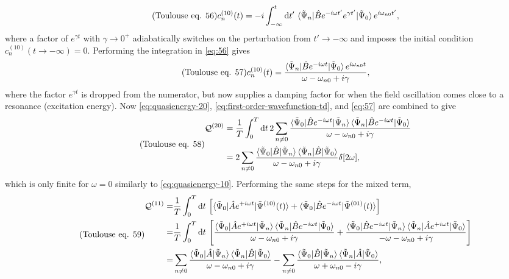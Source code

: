 \documentclass[%
class = book,%
crop = false,%
float = true,%
multi = true,%
preview = false,%
]{standalone}
\begin{document}
\begin{equation}
  \label{eq:56} \tag{Toulouse eq. 56}
  c_{n}^{(10)}(t) = -i \int_{-\infty}^{t} \mathrm{d}t' \, \braket{\tilde{\Psi}_{n}|\hat{B}e^{-i\omega t'}e^{\gamma t'}|\tilde{\Psi}_{0}}e^{i\omega_{n0}t'},
\end{equation}
where a factor of \(e^{\gamma t}\) with \(\gamma \rightarrow 0^{+}\) adiabatically switches on the perturbation from \(t' \rightarrow -\infty\) and imposes the initial condition \(c_{n}^{(10)}(t \rightarrow -\infty) = 0\). Performing the integration in \eqref{eq:56} gives
\begin{equation}
  \label{eq:57} \tag{Toulouse eq. 57}
  c_{n}^{(10)}(t) = \frac{\braket{\tilde{\Psi}_{n}|\hat{B}e^{-i\omega t}|\tilde{\Psi}_{0}}e^{i\omega_{n0}t}}{\omega - \omega_{n0} + i\gamma},
\end{equation} %
where the factor \(e^{\gamma t}\) is dropped from the numerator, but now supplies a damping factor for when the field oscillation comes close to a resonance (excitation energy). Now \eqref{eq:quasienergy-20}, \eqref{eq:first-order-wavefunction-td}, and \eqref{eq:57} are combined to give
\begin{equation}
  \label{eq:58} \tag{Toulouse eq. 58}
  \begin{aligned}
    \mathcal{Q}^{(20)} &= \frac{1}{T} \int_{0}^{T} \mathrm{d}t \, 2\sum_{n\neq 0} \frac{\braket{\tilde{\Psi}_{0}|\hat{B}e^{-i\omega t}|\tilde{\Psi}_{n}}\braket{\tilde{\Psi}_{n}|\hat{B}e^{-i\omega t}|\tilde{\Psi}_{0}}}{\omega - \omega_{n0} + i\gamma} \\
    &= 2\sum_{n\neq 0} \frac{\braket{\tilde{\Psi}_{0}|\hat{B}|\tilde{\Psi}_{n}}\braket{\tilde{\Psi}_{n}|\hat{B}|\tilde{\Psi}_{0}}}{\omega - \omega_{n0} + i\gamma} \delta[2\omega],
  \end{aligned}
\end{equation}
which is only finite for \(\omega = 0\) similarly to \eqref{eq:quasienergy-10}. Performing the same steps for the mixed term,
\begin{equation}
  \label{eq:59} \tag{Toulouse eq. 59}
  \begin{aligned}
    \mathcal{Q}^{(11)} = &\frac{1}{T} \int_{0}^{T} \mathrm{d}t \, \left[ \braket{\tilde{\Psi}_{0}|\hat{A}e^{+i\omega t}|\tilde{\Psi}^{(10)}(t)} + \braket{\tilde{\Psi}_{0}|\hat{B}e^{-i\omega t}|\tilde{\Psi}^{(01)}(t)} \right] \\
    = &\frac{1}{T} \int_{0}^{T} \mathrm{d}t \, \left[ \frac{\braket{\tilde{\Psi}_{0}|\hat{A}e^{+i\omega t}|\tilde{\Psi}_{n}}\braket{\tilde{\Psi}_{n}|\hat{B}e^{-i\omega t}|\tilde{\Psi}_{0}}}{\omega - \omega_{n0} + i\gamma} + \frac{\braket{\tilde{\Psi}_{0}|\hat{B}e^{-i\omega t}|\tilde{\Psi}_{n}}\braket{\tilde{\Psi}_{n}|\hat{A}e^{+i\omega t}|\tilde{\Psi}_{0}}}{-\omega - \omega_{n0} + i\gamma} \right]  \\
    = &\sum_{n\neq 0} \frac{\braket{\tilde{\Psi}_{0}|\hat{A}|\tilde{\Psi}_{n}}\braket{\tilde{\Psi}_{n}|\hat{B}|\tilde{\Psi}_{0}}}{\omega - \omega_{n0} + i\gamma} - \sum_{n\neq 0} \frac{\braket{\tilde{\Psi}_{0}|\hat{B}|\tilde{\Psi}_{n}}\braket{\tilde{\Psi}_{n}|\hat{A}|\tilde{\Psi}_{0}}}{\omega + \omega_{n0} - i\gamma},
  \end{aligned}
\end{equation}
\end{document}
